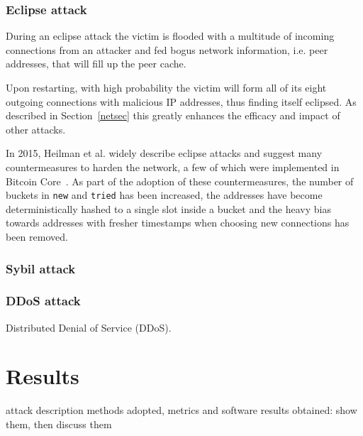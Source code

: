 \documentclass[12pt, letterpaper, twoside]{article}
\begin{document}
\subsubsection{Eclipse attack}\label{eclipse}
During an eclipse attack the victim is flooded with a multitude of incoming connections from an attacker and fed bogus network information, i.e. peer addresses, that will fill up the peer cache. 

Upon restarting, with high probability the victim will form all of its eight outgoing connections with malicious IP addresses, thus finding itself eclipsed. As described in Section~\ref{netsec} this greatly enhances the efficacy and impact of other attacks.

In 2015, Heilman et al. widely describe eclipse attacks and suggest many countermeasures to harden the network, a few of which were implemented in Bitcoin Core~\cite{eclipseatk}. As part of the adoption of these countermeasures, the number of buckets in \texttt{new} and \texttt{tried} has been increased, the addresses have become deterministically hashed to a single slot inside a bucket and the heavy bias towards addresses with fresher timestamps when choosing new connections has been removed.

\subsubsection{Sybil attack}\label{sybil}

\subsubsection{DDoS attack}\label{ddos}
Distributed Denial of Service (DDoS).

\section{Results}\label{res}
attack description
methods adopted, metrics and software
results obtained: show them, then discuss them




















\end{document}
